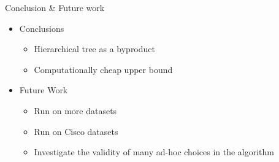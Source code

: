 \documentclass[10pt, aspectratio=169]{beamer}
\begin{document}
\begin{frame}{Conclusion \& Future work}
    \begin{itemize}
        \item Conclusions
        \begin{itemize}
            \item Hierarchical tree as a byproduct
            \item Computationally cheap upper bound
        \end{itemize}
        
        \item Future Work
        \begin{itemize}
            \item Run on more datasets
            \item Run on Cisco datasets
            \item Investigate the validity of many ad-hoc choices in the algorithm
        \end{itemize}
        
    \end{itemize}
\end{frame}


\begin{frame}
    \titlepage
\end{frame}
\end{document}
